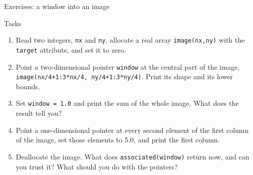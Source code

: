 \begin{frame}{Exercises: a window into an image}
  \begin{block}{Tasks}
    \begin{enumerate}
      \item Read two integers, \texttt{nx} and \texttt{ny}, allocate a real array \texttt{image(nx,ny)} with the \texttt{target} attribute, and set it to zero.
      \item Point a two-dimensional pointer \texttt{window} at the central part of the image, \mbox{\texttt{image(nx/4+1:3*nx/4, ny/4+1:3*ny/4)}}. Print its shape and its lower bounds.
      \item Set \texttt{window = 1.0} and print the sum of the whole image. What does the result tell you?
      \item Point a one-dimensional pointer at every second element of the first column of the image, set those elements to 5.0, and print the first column.
      \item Deallocate the image. What does \texttt{associated(window)} return now, and can you trust it? What should you do with the pointers?
    \end{enumerate}
  \end{block}
\end{frame}




